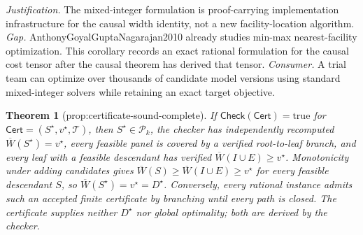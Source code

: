 \documentclass{article}
\newtheorem{theorem}{Theorem}
\begin{document}
\par\smallskip\noindent \textit{Justification.} The mixed-integer formulation is proof-carrying implementation infrastructure for the causal width identity, not a new facility-location algorithm. \textit{Gap.} AnthonyGoyalGuptaNagarajan2010 already studies min-max nearest-facility optimization. This corollary records an exact rational formulation for the causal cost tensor after the causal theorem has derived that tensor. \textit{Consumer.} A trial team can optimize over thousands of candidate model versions using standard mixed-integer solvers while retaining an exact target objective.

\begin{theorem}[prop:certificate-sound-complete]\label{prop:certificate-sound-complete}
If \(\mathsf{Check}(\mathsf{Cert})=\mathrm{true}\) for \(\mathsf{Cert}=(S^{\star},v^{\star},\mathcal T)\), then \(S^{\star}\in\mathcal P_k\), the checker has independently recomputed \(\overline W(S^{\star})=v^{\star}\), every feasible panel is covered by a verified root-to-leaf branch, and every leaf with a feasible descendant has verified \(\overline W(I\cup E)\geq v^{\star}\). Monotonicity under adding candidates gives \(\overline W(S)\geq\overline W(I\cup E)\geq v^{\star}\) for every feasible descendant \(S\), so \(\overline W(S^{\star})=v^{\star}=D^{\star}\). Conversely, every rational instance admits such an accepted finite certificate by branching until every path is closed. The certificate supplies neither \(D^{\star}\) nor global optimality; both are derived by the checker.
\end{theorem}
\end{document}
